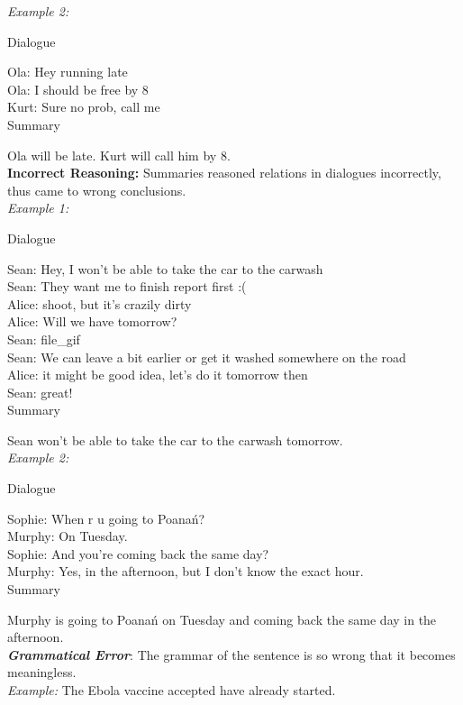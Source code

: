 \textit{Example 2:}

Dialogue

 Ola: Hey running late\\
 Ola: I should be free by 8\\
 Kurt: Sure no prob, call me\\
 
Summary

Ola will be late. Kurt will call him by 8.\\

\textbf{Incorrect Reasoning:} Summaries reasoned relations in dialogues incorrectly,
thus came to wrong conclusions.\\

\textit{Example 1:}

Dialogue

 Sean: Hey, I won't be able to take the car to the carwash\\
 Sean: They want me to finish report first :(\\
 Alice: shoot, but it's crazily dirty\\
 Alice: Will we have tomorrow?\\
 Sean: file\_gif\\
 Sean: We can leave a bit earlier or get it washed somewhere on the road\\
 Alice: it might be  good idea, let's do it tomorrow then\\
 Sean: great!\\

Summary

Sean won't be able to take the car to the carwash tomorrow.\\

\textit{Example 2:}

Dialogue

 Sophie: When r u going to Poanań?\\
 Murphy: On Tuesday.\\
 Sophie: And you're coming back the same day?\\
 Murphy: Yes, in the afternoon, but I don't know the exact hour.\\

Summary

Murphy is going to Poanań on Tuesday and coming back the same day in the afternoon.\\


\textit{\textbf{Grammatical Error}}: The grammar of the sentence is so wrong that it becomes meaningless.\\
\textit{Example:} The Ebola vaccine accepted have already started.\\


